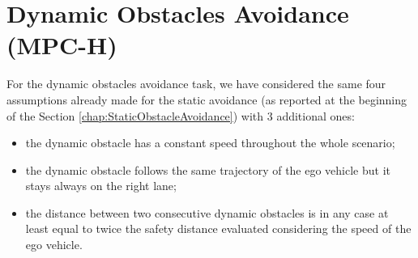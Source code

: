 \section{Dynamic Obstacles Avoidance (MPC-H)}
For the dynamic obstacles avoidance task, we have considered the same four assumptions already made for the static avoidance (as reported at the beginning of the Section \ref{chap:StaticObstacleAvoidance}) with 3 additional ones:
\begin{itemize}
    \item the dynamic obstacle has a constant speed throughout the whole scenario;
    \item the dynamic obstacle follows the same trajectory of the ego vehicle but it stays always on the right lane;
    \item the distance between two consecutive dynamic obstacles is in any case at least equal to twice the safety distance evaluated considering the speed of the ego vehicle.
\end{itemize}

